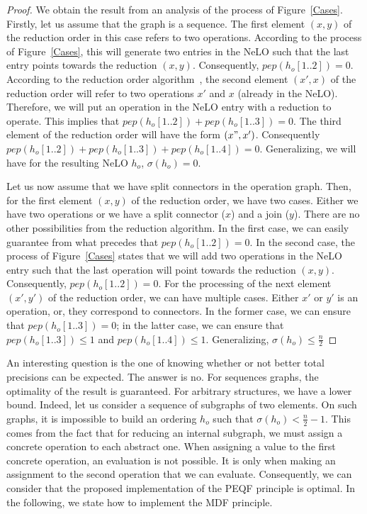 \documentclass[a4paper]{article}
\begin{document}
\begin{proof}

We obtain the result from an analysis of the process of Figure~\ref{Cases}. Firstly, let us assume that 
the graph is a sequence. 
The first element $(x,y)$ of the reduction order in this case refers to two operations. 
According to the process of Figure~\ref{Cases}, this will generate two entries in the NeLO such that the 
last entry points towards the reduction $(x,y)$. Consequently, $pep(h_o[1..2]) = 0$. According to 
the reduction order algorithm~\cite{GoldmanNgoko}, the second element $(x',x)$ of the reduction order will refer to two 
operations $x'$ and $x$ (already in the NeLO). Therefore, we will put an operation in the NeLO entry with a reduction to operate. 
This implies that $pep(h_o[1..2])+pep(h_o[1..3]) =  0$. The third element of the reduction order will have the form $(x",x')$. 
Consequently $pep(h_o[1..2])+pep(h_o[1..3])+ pep(h_o[1..4])=  0$. Generalizing, we will have for the resulting NeLO $h_o$, 
$\sigma(h_o) = 0$. 

Let us now assume that we have split connectors in the operation graph. Then, for the first element $(x,y)$ of the reduction order, we have two cases. Either we have two operations or we have a split connector ($x$) and a join ($y$). 
There are no other possibilities from the reduction algorithm. In the first case, we can easily guarantee from what 
precedes that $pep(h_o[1..2]) = 0$. In the second case, the process of Figure~\ref{Cases} states that we will 
add two operations in the NeLO entry such that the last operation will point towards the reduction $(x,y)$. Consequently, 
 $pep(h_o[1..2]) = 0$. For the processing of the next element $(x', y')$ of the reduction order, we can have multiple cases. Either 
$x'$ or $y'$ is an operation, or, they correspond to connectors. In the former case, we can ensure that $pep(h_o[1..3]) = 0$; 
in the latter case, we can ensure that $pep(h_o[1..3])  \leq 1$ and $pep(h_o[1..4]) \leq 1$. Generalizing, 
$\displaystyle \sigma(h_o) \leq \frac{n}{2}$

\end{proof}

An interesting question is the one of knowing whether or not better total precisions can be expected. 
The answer is no. For sequences graphs, the optimality of the result is guaranteed. For arbitrary structures, we have a lower 
bound. Indeed, let us consider a sequence of subgraphs of two elements. On such graphs, it is impossible to build an ordering 
$h_o$ such that $\sigma(h_o) < \frac{n}{2}-1$. This comes from the fact that for reducing an internal subgraph, 
we must assign a concrete operation to each abstract one. When assigning a value to the first concrete operation, an evaluation is not possible. It is only when making 
an assignment to the second operation that we can evaluate.  Consequently, we can consider that the proposed implementation of the 
PEQF principle is optimal. In the following, we state how to implement the MDF principle. 
\end{document}
